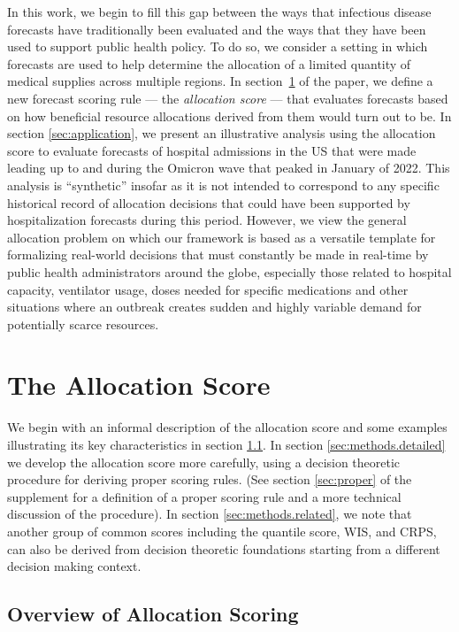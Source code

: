 \documentclass{article}\usepackage[]{graphicx}\usepackage[]{xcolor}
\begin{document}
In this work, we begin to fill this gap between the ways that infectious disease forecasts have traditionally been
evaluated and the ways that they have been used to support public health policy. To do so, we consider a setting in
which forecasts are used to help determine the allocation of a limited quantity of medical supplies across multiple
regions. In section~\ref{sec:methods} of the paper, we define a new forecast scoring rule --- the {\em allocation score}
--- that evaluates forecasts based on how beneficial resource allocations derived from them would turn out to be. In
section \ref{sec:application}, we present an illustrative analysis using the allocation score to evaluate forecasts of
hospital admissions in the US that were made leading up to and during the Omicron wave that peaked in January of 2022.
This analysis is ``synthetic'' insofar as it is not intended to correspond to any specific historical record of
allocation decisions that could have been supported by hospitalization forecasts during this period. However, we view
the general allocation problem on which our framework is based as a versatile template for formalizing real-world
decisions that must constantly be made in real-time by public health administrators around the globe, especially those
related to hospital capacity, ventilator usage, doses needed for specific medications and other situations where an
outbreak creates sudden and highly variable demand for potentially scarce resources.  

\section{The Allocation Score}
\label{sec:methods}

We begin with an informal description of the allocation score and some examples illustrating its key characteristics in
section \ref{sec:methods.overview}. In section \ref{sec:methods.detailed} we develop the allocation score more
carefully, using a decision theoretic procedure for deriving proper scoring rules. (See section \ref{sec:proper} of the
supplement for a definition of a proper scoring rule and a more technical discussion of the procedure). In section
\ref{sec:methods.related}, we note that another group of common scores including the quantile score, WIS, and CRPS, can
also be derived from decision theoretic foundations \textemdash starting from a different decision making context.

\subsection{Overview of Allocation Scoring}
\label{sec:methods.overview}
\end{document}
